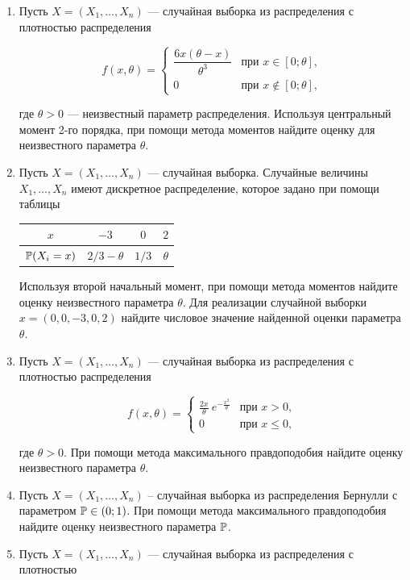 \begin{enumerate}
\item Пусть $X=(X_1, \ldots ,X_n)$ — случайная выборка из распределения с плотностью распределения

\[
f(x,\theta) =
\begin{cases}
\dfrac{6x(\theta-x)}{\theta^3} & \text{при } x \in [0;\theta], \\
0 & \text{при } x \not\in [0;\theta],
\end{cases}
\]


где $\theta > 0$ — неизвестный параметр распределения. Используя центральный момент 2-го порядка, при помощи метода моментов найдите оценку для неизвестного параметра $\theta$.

\item Пусть $X=(X_1, \ldots,X_n)$ — случайная выборка. Случайные величины $X_1, \ldots, X_n$ имеют дискретное распределение, которое задано при помощи таблицы

\begin{center}
\begin{tabular}{cccc}
\toprule
 $x$ & $-3$  &$ 0 $  & $2 $  \\
 \midrule
 $\P(X_i = x)$ & $2/3 - \theta$ & $1/3$ & $\theta$ \\
 \bottomrule
\end{tabular}
\end{center}

Используя второй начальный момент, при помощи метода моментов найдите оценку неизвестного параметра $\theta$. Для реализации случайной выборки $x=(0,0,-3,0,2)$ найдите числовое значение найденной оценки параметра $\theta$.

\item Пусть $X=(X_1, \ldots,X_n)$ — случайная выборка из распределения с плотностью распределения

\[
f(x,\theta) =
\begin{cases}
\frac{2x}{\theta} \ e^{-\frac{x^2}{\theta}} & \text{при } x>0, \\
0 & \text{при } x \leq 0,
\end{cases}
\]

где $\theta > 0$. При помощи метода максимального правдоподобия найдите оценку неизвестного параметра $\theta$.

\item Пусть $X=(X_1, \ldots, X_n)$ – случайная выборка из распределения Бернулли с параметром $\P \in (0;1)$. При помощи метода максимального правдоподобия найдите оценку неизвестного параметра $\P$.

\item Пусть $X=(X_1, \ldots, X_n)$ — случайная выборка из распределения с плотностью


\end{enumerate}
